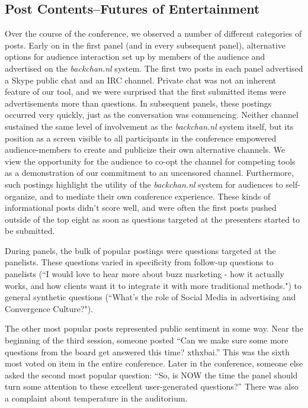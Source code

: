 \subsection{Post Contents--Futures of Entertainment}

Over the course of the conference, we observed a number of different categories of posts. Early on in the first panel (and in every subsequent panel), alternative options for audience interaction set up by members of the audience and advertised on the \emph{backchan.nl} system. The first two posts in each panel advertised a Skype public chat and an IRC channel. Private chat was not an inherent feature of our tool, and we were surprised that the first submitted items were advertisements more than questions. In subsequent panels, these postings occurred very quickly, just as the conversation was commencing. Neither channel sustained the same level of involvement as the \emph{backchan.nl} system itself, but its position as a screen visible to all participants in the conference empowered audience-members to create and publicize their own alternative channels. We view the opportunity for the audience to co-opt the channel for competing tools as a demonstration of our commitment to an uncensored channel. Furthermore, such postings highlight the utility of the \emph{backchan.nl} system for audiences to self-organize, and to mediate their own conference experience. These kinds of informational posts didn't score well, and were often the first posts pushed outside of the top eight as soon as questions targeted at the presenters started to be submitted.

During panels, the bulk of popular postings were questions targeted at the panelists. These questions varied in specificity from follow-up questions to panelists (``I would love to hear more about buzz marketing - how it actually works, and how clients want it to integrate it with more traditional methods.") to general synthetic questions (``What's the role of Social Media in advertising and Convergence Culture?").

The other most popular posts represented public sentiment in some way. Near the beginning of the third session, someone posted ``Can we make sure some more questions from the board get answered this time? xthxbai.'' This was the sixth most voted on item in the entire conference. Later in the conference, someone else asked the second most popular question: ``So, is NOW the time the panel should turn some attention to these excellent user-generated questions?'' There was also a complaint about temperature in the auditorium.

